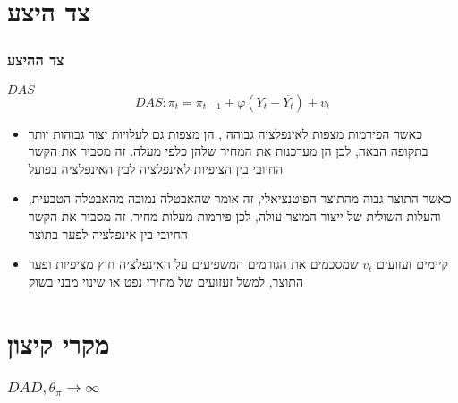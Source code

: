 \documentclass[10pt,usenames,dvipsnames]{beamer}
\newcommand{\heart}{\ensuremath\heartsuit}
\begin{document}
\begin{RTL}
\section{צד היצע}
\begin{frame}
    \frametitle{צד ההיצע}
    \begin{block}{$DAS$}
    $$DAS : \pi_t = \pi_{t-1} + \varphi \left(Y_t - \overline{Y_t}\right) + v_t $$
        \begin{itemize}
            \item כאשר הפירמות מצפות לאינפלציה גבוהה , הן מצפות גם לעלויות יצור גבוהות יותר בתקופה הבאה, לכן הן מעדכנות את המחיר שלהן כלפי מעלה. זה מסביר את הקשר החיובי בין הציפיות לאינפלציה לבין האינפלציה בפועל
            \item כאשר התוצר גבוה מהתוצר הפוטנציאלי, זה אומר שהאבטלה נמוכה מהאבטלה הטבעית, והעלות השולית של ייצור המוצר עולה, לכן פירמות מעלות מחיר. זה מסביר את הקשר החיובי בין אינפלציה לפער בתוצר
            \item קיימים זעזועים $v_t$ שמסכמים את הגורמים המשפיעים על האינפלציה חוץ מציפיות ופער התוצר, למשל זעזועים של מחירי נפט או שינוי מבני בשוק
        \end{itemize}
    \end{block}


\end{frame}

\section{מקרי קיצון}
\begin{frame}
    \frametitle{$DAD, \theta_\pi \to \infty$}
    \begin{center}
\end{center}
\end{frame}
\end{RTL}
\end{document}

